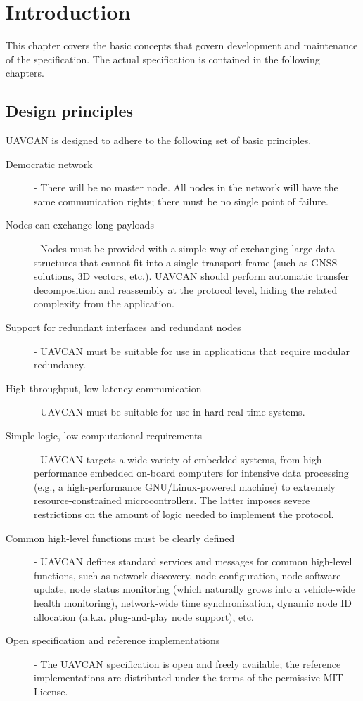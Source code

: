 \chapter{Introduction}\label{sec:introduction}

This chapter covers the basic concepts that govern development and maintenance of the specification.
The actual specification is contained in the following chapters.

\section{Design principles}

UAVCAN is designed to adhere to the following set of basic principles.

\begin{description}
    \item[Democratic network] - There will be no master node.
    All nodes in the network will have the same communication rights; there must be no single point of failure.

    \item[Nodes can exchange long payloads] - Nodes must be provided with a simple way of exchanging large
    data structures that cannot fit into a single transport frame (such as GNSS solutions, 3D vectors, etc.).
    UAVCAN should perform automatic transfer decomposition and reassembly at the protocol level,
    hiding the related complexity from the application.

    \item[Support for redundant interfaces and redundant nodes] - UAVCAN must be suitable for use in
    applications that require modular redundancy.

    \item[High throughput, low latency communication] - UAVCAN must be suitable for use in
    hard real-time systems.

    \item[Simple logic, low computational requirements] - UAVCAN targets a wide variety of embedded systems,
    from high-performance embedded on-board computers for intensive data processing
    (e.g., a high-performance GNU/Linux-powered machine) to extremely resource-constrained microcontrollers.
    The latter imposes severe restrictions on the amount of logic needed to implement the protocol.

    \item[Common high-level functions must be clearly defined] - UAVCAN defines standard services
    and messages for common high-level functions, such as network discovery, node configuration,
    node software update, node status monitoring (which naturally grows into a vehicle-wide health monitoring),
    network-wide time synchronization, dynamic node ID allocation (a.k.a. plug-and-play node support), etc.

    \item[Open specification and reference implementations] - The UAVCAN specification is open and
    freely available; the reference implementations are distributed under the terms of the permissive MIT License.
\end{description}

